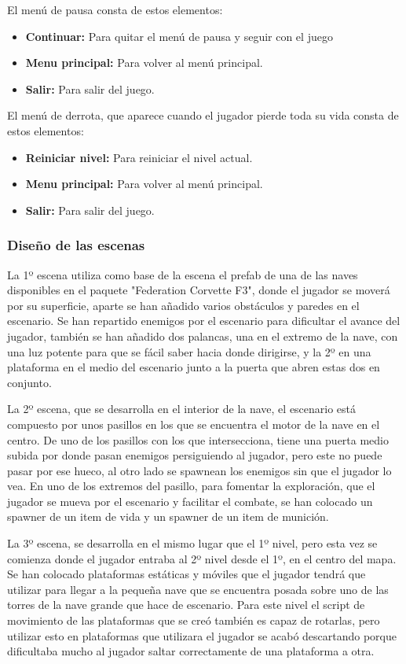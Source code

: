 El menú de pausa consta de estos elementos:
\begin{itemize}
	\item \textbf{Continuar:} Para quitar el menú de pausa y seguir con el juego
	\item \textbf{Menu principal:} Para volver al menú principal.
	\item \textbf{Salir:} Para salir del juego.
\end{itemize}
El menú de derrota, que aparece cuando el jugador pierde toda su vida consta de estos elementos:
\begin{itemize}
	\item \textbf{Reiniciar nivel:} Para reiniciar el nivel actual.
	\item \textbf{Menu principal:} Para volver al menú principal.
	\item \textbf{Salir:} Para salir del juego.
\end{itemize}

\subsubsection{Diseño de las escenas}
La 1º escena utiliza como base de la escena el prefab de una de las naves disponibles en el paquete "Federation Corvette F3", donde el jugador se moverá por su superficie, aparte se han añadido varios obstáculos y paredes en el escenario. Se han repartido enemigos por el escenario para dificultar el avance del jugador, también se han añadido dos palancas, una en el extremo de la nave, con una luz potente para que se fácil saber hacia donde dirigirse, y la 2º en una plataforma en el medio del escenario junto a la puerta que abren estas dos en conjunto.

La 2º escena, que se desarrolla en el interior de la nave, el escenario está compuesto por unos pasillos en los que se encuentra el motor de la nave en el centro. De uno de los pasillos con los que intersecciona, tiene una puerta medio subida por donde pasan enemigos persiguiendo al jugador, pero este no puede pasar por ese hueco, al otro lado se spawnean los enemigos sin que el jugador lo vea. En uno de los extremos del pasillo, para fomentar la exploración, que el jugador se mueva por el escenario y facilitar el combate, se han colocado un spawner de un item de vida y un spawner de un item de munición.

La 3º escena, se desarrolla en el mismo lugar que el 1º nivel, pero esta vez se comienza donde el jugador entraba al 2º nivel desde el 1º, en el centro del mapa. Se han colocado plataformas estáticas y móviles que el jugador tendrá que utilizar para llegar a la pequeña nave que se encuentra posada sobre uno de las torres de la nave grande que hace de escenario. Para este nivel el script de movimiento de las plataformas que se creó también es capaz de rotarlas, pero utilizar esto en plataformas que utilizara el jugador se acabó descartando porque dificultaba mucho al jugador saltar correctamente de una plataforma a otra.

